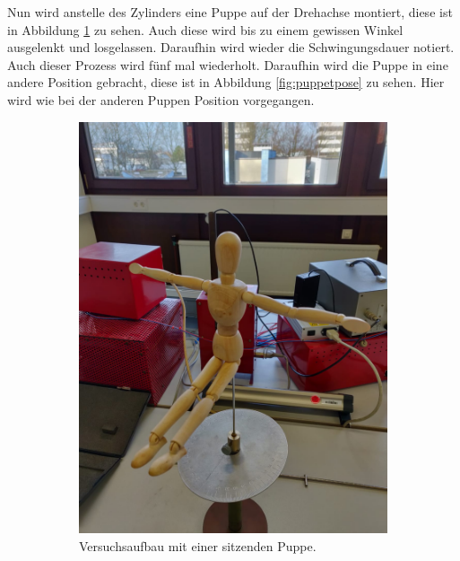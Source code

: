 \FloatBarrier
Nun wird anstelle des Zylinders eine Puppe auf der Drehachse montiert, diese ist in Abbildung \ref{fig:puppesitzend} zu sehen.
Auch diese wird bis zu einem gewissen Winkel ausgelenkt und losgelassen.
Daraufhin wird wieder die Schwingungsdauer notiert.
Auch dieser Prozess wird fünf mal wiederholt.
Daraufhin wird die Puppe in eine andere Position gebracht, diese ist in Abbildung \ref{fig:puppetpose} zu sehen.
Hier wird wie bei der anderen Puppen Position vorgegangen.

\begin{figure}
\centering
\begin{subfigure}{0.5\textwidth}
    \centering
    \includegraphics[scale=0.1]{content/data/PuppeSitzend.png}
    \caption{Versuchsaufbau mit einer sitzenden Puppe.}
    \label{fig:puppesitzend}
\end{subfigure}%
\begin{subfigure}{0.5\textwidth}
    \centering

\end{subfigure}
\end{figure}
